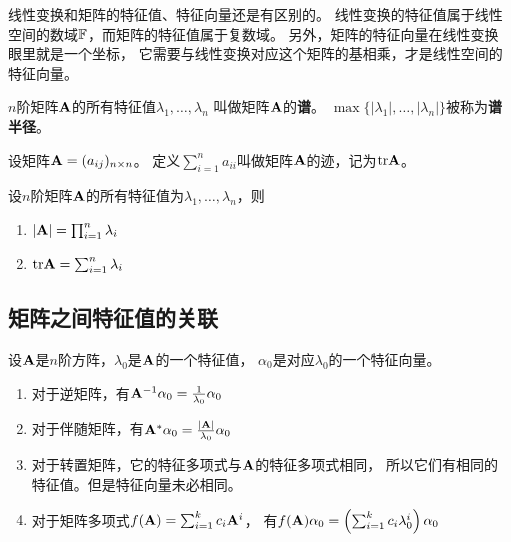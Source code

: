 \begin{remark}
  线性变换和矩阵的特征值、特征向量还是有区别的。
  线性变换的特征值属于线性空间的数域$\mathbb{F}$，而矩阵的特征值属于复数域。
  另外，矩阵的特征向量在线性变换眼里就是一个坐标，
  它需要与线性变换对应这个矩阵的基相乘，才是线性空间的特征向量。
\end{remark}

\begin{definition}[矩阵的谱]
  $n$阶矩阵$\mathbf{A}$的所有特征值$\lambda_1,\dots,\lambda_n$
  叫做矩阵$\mathbf{A}$的\textbf{谱}。
  $\max\{|\lambda_1|,\dots,|\lambda_n|\}$被称为\textbf{谱半径}。
\end{definition}

\begin{definition}[矩阵的迹]
  设矩阵$\mathbf{A}=(a_{ij})_{n\times n}$。
  定义$\sum_{i=1}^{n}a_{ii}$叫做矩阵$\mathbf{A}$的迹，记为$\textrm{tr}\mathbf{A}$。
\end{definition}

\begin{theorem}[特征值的性质]
  设$n$阶矩阵$\mathbf{A}$的所有特征值为$\lambda_1,\dots,\lambda_n$，则
  \begin{enumerate}
    \item $|\mathbf{A}| = \prod_{i=1}^{n}\lambda_i$
    \item $\textrm{tr}\mathbf{A} = \sum_{i=1}^{n}\lambda_i$
  \end{enumerate}
\end{theorem}

\subsection{矩阵之间特征值的关联}
\begin{theorem}[矩阵运算对特征值和特征向量的影响]
  设$\mathbf{A}$是$n$阶方阵，$\lambda_0$是$\mathbf{A}$的一个特征值，
  $\alpha_0$是对应$\lambda_0$的一个特征向量。
  \begin{enumerate}
    \item
    对于逆矩阵，有$\mathbf{A}^{-1}\alpha_0 = \frac{1}{\lambda_0}\alpha_0$
    \item
    对于伴随矩阵，有$\mathbf{A}^*\alpha_0 = \frac{|\mathbf{A}|}{\lambda_0}\alpha_0$
    \item
    对于转置矩阵，它的特征多项式与$\mathbf{A}$的特征多项式相同，
    所以它们有相同的特征值。但是特征向量未必相同。
    \item
    对于矩阵多项式$f(\mathbf{A})=\sum_{i=1}^{k} c_i\mathbf{A}^i$，
    有$f(\mathbf{A})\alpha_0=\left(\sum_{i=1}^{k} c_i\lambda_0^i\right)\alpha_0$
  \end{enumerate}
\end{theorem}

